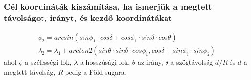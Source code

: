 \subsubsection{Cél koordináták kiszámítása, ha ismerjük a megtett távolságot, irányt, és kezdő koordinátákat}
\begin{gather*}
    \phi_{2} = arcsin(sin \phi_{1} \cdot cos \delta + cos \phi_{1} \cdot sin \delta \cdot cos \theta)\\
    \lambda_{2} = \lambda_{1} + arctan2(sin\theta \cdot sin\delta  \cdot cos\phi_{1}, cos\delta - sin\phi_{1} \cdot sin\phi_{2})
\end{gather*}
ahol $\phi$ a szélességi fok, $\lambda$ a hosszúsági fok, $\theta$ az irány, $\delta$ a szögtávolság $d/R$ és $d$ a megtett távolság, $R$ pedig a Föld sugara.

